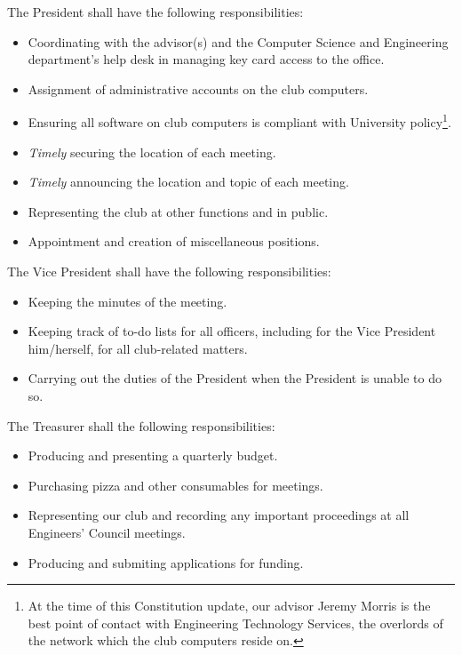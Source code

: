 \documentclass{article}
\begin{document}
	The President shall have the following responsibilities:
	\begin{itemize}
		\item Coordinating with the advisor(s) and the Computer Science and Engineering department's help desk in managing key card access to the office.
		\item Assignment of administrative accounts on the club computers.
		\item Ensuring all software on club computers is compliant with University policy\footnote{At the time of this Constitution update, our advisor Jeremy Morris is the best point of contact with Engineering Technology Services, the overlords of the network which the club computers reside on.}.
		\item \textit{Timely} securing the location of each meeting.
		\item \textit{Timely} announcing the location and topic of each meeting.
		\item Representing the club at other functions and in public.
		\item Appointment and creation of miscellaneous positions.\pagebreak
	\end{itemize}
	
	The Vice President shall have the following responsibilities:
	\begin{itemize}
		\item Keeping the minutes of the meeting.
		\item Keeping track of to-do lists for all officers, including for the Vice President him/herself, for all club-related matters.
		\item Carrying out the duties of the President when the President is unable to do so.\\
	\end{itemize}

	The Treasurer shall the following responsibilities:
	\begin{itemize}
		\item Producing and presenting a quarterly budget.
		\item Purchasing pizza and other consumables for meetings.
		\item Representing our club and recording any important proceedings at all Engineers' Council meetings.
		\item Producing and submiting applications for funding.\\
	\end{itemize}
\end{document}
